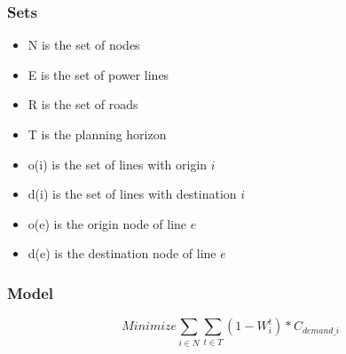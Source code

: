 \documentclass{article}
\begin{document}
	\subsubsection{Sets}
	\begin{itemize}
		\item N is the set of nodes
		\item E is the set of power lines
		\item R is the set of roads
		\item T is the planning horizon
		\item o(i) is the set of lines with origin $i$
		\item d(i) is the set of lines with destination $i$
		\item o(e) is the origin node of line $e$
		\item d(e) is the destination node of line $e$
	\end{itemize}
	\subsubsection{Model}
	$$	Minimize \sum_{i \in N} \sum_{t \in T} (1-W_i^t)*C_{demand\_i} $$
	
\end{document}
